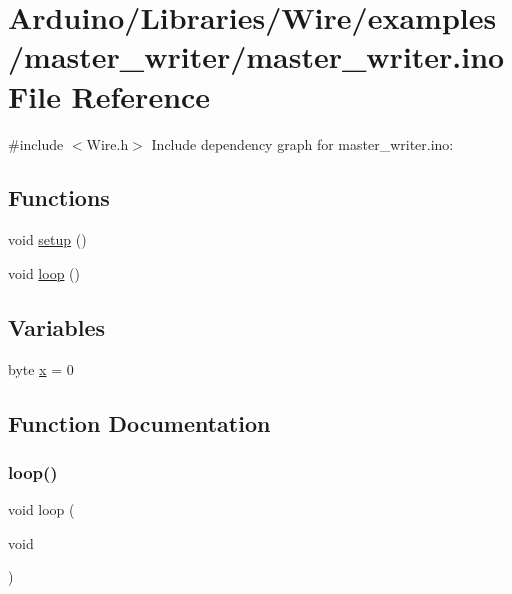 \hypertarget{master__writer_8ino}{}\section{Arduino/\+Libraries/\+Wire/examples/master\+\_\+writer/master\+\_\+writer.ino File Reference}
\label{master__writer_8ino}
{\ttfamily \#include $<$Wire.\+h$>$}\newline
Include dependency graph for master\+\_\+writer.\+ino\+:
\subsection*{Functions}
\begin{DoxyCompactItemize}
\item 
void \hyperlink{master__writer_8ino_a4fc01d736fe50cf5b977f755b675f11d}{setup} ()
\item 
void \hyperlink{master__writer_8ino_afe461d27b9c48d5921c00d521181f12f}{loop} ()
\end{DoxyCompactItemize}
\subsection*{Variables}
\begin{DoxyCompactItemize}
\item 
byte \hyperlink{master__writer_8ino_ac8eed5648fb8a5f8f8c3c424a4590195}{x} = 0
\end{DoxyCompactItemize}


\subsection{Function Documentation}
\mbox{\label{master__writer_8ino_afe461d27b9c48d5921c00d521181f12f}} 
\subsubsection{\texorpdfstring{loop()}{loop()}}
{\footnotesize\ttfamily void loop (\begin{DoxyParamCaption}\item[{void}]{ }\end{DoxyParamCaption})}

